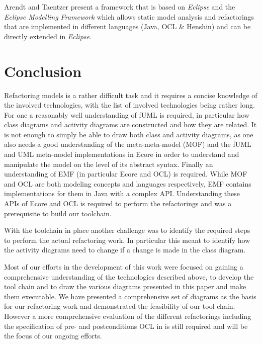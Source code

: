 \documentclass{llncs}
\begin{document}

Arendt and Taentzer \cite{DBLP:journals/ase/ArendtT13} present a framework that is based on \textit{Eclipse} and the
\textit{Eclipse Modelling Framework} which allows static model analysis and refactorings that are implemented in
different languages (Java, OCL \& Henshin) and can be directly extended in \textit{Eclipse}.


\section{Conclusion}
\label{sec:conclusion}
Refactoring models is a rather difficult task and it requires a concise knowledge of the involved technologies, with
the list of involved technologies being rather long. For one a reasonably well understanding of fUML is required, in
particular how class diagrams and activity diagrams are constructed and how they are related. It is not enough to simply
be able to draw both class and activity diagrams, as one also needs a good understanding of the meta-meta-model (MOF) and
the fUML and UML meta-model implementations in Ecore in order to understand and manipulate the model on the level of its 
abstract syntax. Finally an understanding of EMF (in particular Ecore and OCL) is required. While MOF and OCL are both 
modeling concepts and languages respectively, EMF contains implementations for them in Java with a complex API. 
Understanding these APIs of Ecore and OCL is required to perform the refactorings and was a prerequisite to build
our toolchain.

With the toolchain in place another challenge was to identify the required steps to perform the actual refactoring work.
In particular this meant to identify how the activity diagrams need to change if a change is made in the class
diagram.

Most of our efforts in the development of this work were focused on gaining a comprehensive understanding of the
technologies described above, to develop the tool chain and to draw the various diagrams presented in this paper and make 
them executable. We have presented a comprehensive set of diagrams as the basis for our refactoring work and demonstrated 
the feasibility of our tool chain. However a more comprehensive evaluation of the different refactorings including the 
specification of pre- and postconditions OCL in is still required and will be the focus of our ongoing efforts.

\newpage


\end{document}
